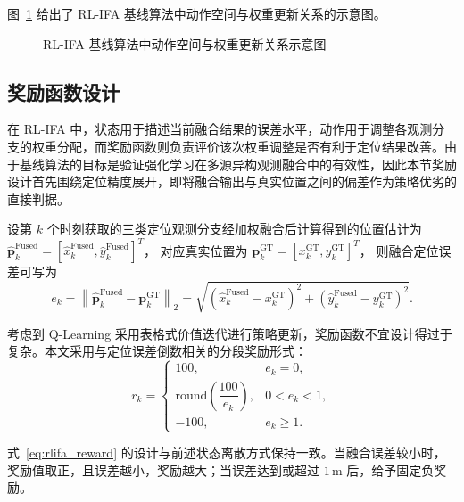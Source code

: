 图~\ref{fig:rlifa_action_design} 给出了 RL-IFA 基线算法中动作空间与权重更新关系的示意图。

\begin{figure}[htbp]
    \centering
    \vspace{4.2cm}
    \caption{RL-IFA 基线算法中动作空间与权重更新关系示意图}
    \label{fig:rlifa_action_design}
\end{figure}

\subsection{奖励函数设计}
\label{subsec:3_3_3}

在 RL-IFA 中，状态用于描述当前融合结果的误差水平，动作用于调整各观测分支的权重分配，而奖励函数则负责评价该次权重调整是否有利于定位结果改善。由于基线算法的目标是验证强化学习在多源异构观测融合中的有效性，因此本节奖励设计首先围绕定位精度展开，即将融合输出与真实位置之间的偏差作为策略优劣的直接判据。

设第 \(k\) 个时刻获取的三类定位观测分支经加权融合后计算得到的位置估计为
\(\hat{\mathbf{p}}_k^{\mathrm{Fused}}=[\hat{x}_k^{\mathrm{Fused}},\hat{y}_k^{\mathrm{Fused}}]^T\)，
对应真实位置为
\(\mathbf{p}_k^{\mathrm{GT}}=[x_k^{\mathrm{GT}},y_k^{\mathrm{GT}}]^T\)，
则融合定位误差可写为
\begin{equation}
e_k=\left\|\hat{\mathbf{p}}_k^{\mathrm{Fused}}-\mathbf{p}_k^{\mathrm{GT}}\right\|_2
=\sqrt{\left(\hat{x}_k^{\mathrm{Fused}}-x_k^{\mathrm{GT}}\right)^2+
\left(\hat{y}_k^{\mathrm{Fused}}-y_k^{\mathrm{GT}}\right)^2 }.
\label{eq:rlifa_reward_error}
\end{equation}

考虑到 Q-Learning 采用表格式价值迭代进行策略更新，奖励函数不宜设计得过于复杂。本文采用与定位误差倒数相关的分段奖励形式：
\begin{equation}
r_k=
\begin{cases}
100, & e_k=0,\\[4pt]
\mathrm{round}\!\left(\dfrac{100}{e_k}\right), & 0<e_k<1,\\[8pt]
-100, & e_k\geq 1.
\end{cases}
\label{eq:rlifa_reward}
\end{equation}

式~\eqref{eq:rlifa_reward} 的设计与前述状态离散方式保持一致。当融合误差较小时，奖励值取正，且误差越小，奖励越大；当误差达到或超过 \(1\,\mathrm{m}\) 后，给予固定负奖励。

